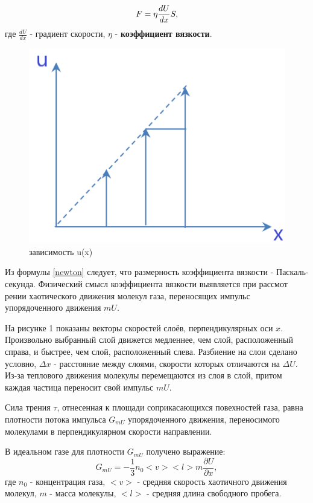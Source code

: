 \documentclass[a4paper,12pt]{article}
\begin{document}
\begin{equation}\label{newton}
F = \eta\frac{dU}{dx}S,
\vspace{0.3cm}
\end{equation}
где $\frac{dU}{dx}$ - градиент скорости, $\eta$ - \textbf{коэффициент вязкости}.
	
\begin{figure}[h!]
	\begin{center}
		\includegraphics[scale=0.5]{1}
	\end{center}
	\caption{зависимость u(x)}
\end{figure}
	
	
Из формулы \eqref{newton} следует, что размерность коэффициента вязкости - Паскаль-секунда.
Физический смысл коэффициента вязкости выявляется при рассмот
рении хаотического движения молекул газа, переносящих импульс упорядоченного движения $mU$.
	
На рисунке 1 показаны векторы скоростей слоёв, перпендикулярных оси $x$. Произвольно выбранный слой движется медленнее, чем слой, расположенный справа, и быстрее, чем слой, расположенный слева. Разбиение на слои сделано условно, $\Delta x$ - расстояние между слоями, скорости которых отличаются на $\Delta U$. Из-за теплового движения молекулы перемещаются из слоя в слой, притом каждая частица переносит свой импульс $mU$.
	
Сила трения $\tau$, отнесенная к площади соприкасающихся повехностей газа, равна плотности потока импульса $G_{mU}$ упорядоченного движения, переносимого молекулами в перпендикулярном скорости направлении.
	
В идеальном газе для плотности $G_{mU}$ получено выражение:
\begin{equation}
G_{mU} = -\frac{1}{3}n_0<v><l>m\frac{\partial U}{\partial x},
\end{equation}
где $n_0$ - концентрация газа, $<v>$ - средняя скорость хаотичного движения молекул, $m$ - масса молекулы, $<l>$ - средняя длина свободного пробега.
	
\end{document}
